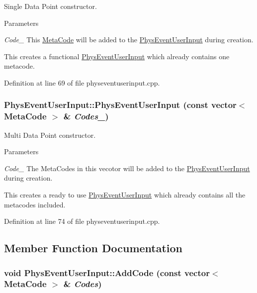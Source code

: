 Single Data Point constructor. 
\begin{DoxyParams}{Parameters}
\item[{\em Code\_\-}]This \hyperlink{classMetaCode}{MetaCode} will be added to the \hyperlink{classPhysEventUserInput}{PhysEventUserInput} during creation.\end{DoxyParams}
This creates a functional \hyperlink{classPhysEventUserInput}{PhysEventUserInput} which already contains one metacode. 

Definition at line 69 of file physeventuserinput.cpp.\hypertarget{classPhysEventUserInput_a0a9bd99d8db6f171ef3c87bd417ccc4a}{
\subsubsection[{PhysEventUserInput}]{\setlength{\rightskip}{0pt plus 5cm}PhysEventUserInput::PhysEventUserInput (const vector$<$ {\bf MetaCode} $>$ \& {\em Codes\_\-})}}
\label{dc/d0e/classPhysEventUserInput_a0a9bd99d8db6f171ef3c87bd417ccc4a}


Multi Data Point constructor. 
\begin{DoxyParams}{Parameters}
\item[{\em Code\_\-}]The MetaCodes in this vecotor will be added to the \hyperlink{classPhysEventUserInput}{PhysEventUserInput} during creation.\end{DoxyParams}
This creates a ready to use \hyperlink{classPhysEventUserInput}{PhysEventUserInput} which already contains all the metacodes included. 

Definition at line 74 of file physeventuserinput.cpp.

\subsection{Member Function Documentation}
\hypertarget{classPhysEventUserInput_aecac02073d3296c71e0ae4534daf8dce}{
\subsubsection[{AddCode}]{\setlength{\rightskip}{0pt plus 5cm}void PhysEventUserInput::AddCode (const vector$<$ {\bf MetaCode} $>$ \& {\em Codes})}}
\label{dc/d0e/classPhysEventUserInput_aecac02073d3296c71e0ae4534daf8dce}


